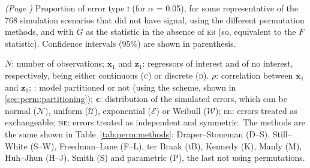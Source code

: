 \begin{table}[b!]
\caption[Amount of error type \textsc{i} for representative simulation scenarios.]{\emph{(Page \pageref{tab:perm:methods_resultsT})} Proportion of error type \textsc{i} (for $\alpha$ = 0.05), for some representative of the 768 simulation scenarios that did not have signal, using the different permutation methods, and with $G$ as the statistic in the absence of \textsc{eb} (so, equivalent to the $F$ statistic). Confidence intervals (95\%) are shown in parenthesis.}
{\footnotesize
$N$: number of observations;
$\mathbf{x}_1$ and $\mathbf{z}_1$: regressors of interest and of no interest, respectively, being either continuous (\textsc{c}) or discrete (\textsc{d}).
$\rho$: correlation between $\mathbf{x}_1$ and $\mathbf{z}_1$;
: model partitioned or not (using the \citet{Beckmann2001} scheme, shown in \ref{sec:perm:partitioning});
$\mathbf{\epsilon}$: distribution of the simulated errors, which can be normal ($\mathcal{N}$), uniform ($\mathcal{U}$), exponential ($\mathcal{E}$) or Weibull ($\mathcal{W}$);
\textsc{ee}: errors treated as exchangeable;
\textsc{ise}: errors treated as independent and symmetric.
The methods are the same shown in Table~\ref{tab:perm:methods}: Draper--Stoneman (D--S), Still--White (S--W), Freedman--Lane (F--L), ter Braak (tB), Kennedy (K), Manly (M), Huh--Jhun (H--J), Smith (S) and parametric (P), the last not using permutations.
\par}
\label{tab:perm:methods_resultsC}
\end{table}


